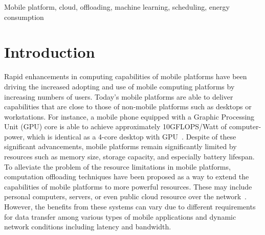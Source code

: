 \documentclass[10pt, conference, compsocconf]{IEEEtran}
\begin{document}
\begin{IEEEkeywords}
Mobile platform, cloud, offloading, machine learning, scheduling, energy
consumption
\end{IEEEkeywords} 

\section{Introduction}
Rapid enhancements in computing capabilities of mobile platforms
have been driving the increased adopting and use of mobile computing
platforms by increasing numbers of users.
%
Today's mobile platforms are able to deliver capabilities that are close
to those of non-mobile platforms such as desktops or workstations.
%
%
For instance, a mobile phone equipped with a Graphic Processing Unit
(GPU) core is able to achieve approximately 10GFLOPS/Watt of
computer-power, which is identical as a 4-core desktop with GPU~\cite{tolga}.
%
Despite of these significant advancements, mobile platforms remain
significantly limited by resources such as memory size, storage
capacity, and especially battery lifespan.
%
To alleviate the problem of the resource limitations in mobile platforms,
computation offloading techniques have been proposed as a way to extend 
the capabilities of mobile platforms to more powerful resources. 
%
These may include personal computers, servers, or even public cloud
resource over the network~\cite{snarf, maui, cuckoo}.\\
%
%
%
\indent However, the benefits from these systems can vary due to
different requirements for data transfer among various types of mobile
applications and dynamic network conditions including latency and
bandwidth.
\end{document}
